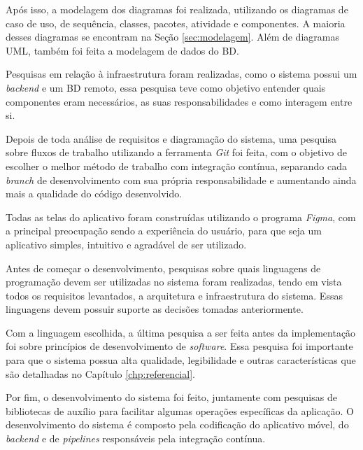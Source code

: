 Após isso, a modelagem dos diagramas foi realizada, utilizando os diagramas de caso de uso, de sequência, classes, pacotes, atividade e componentes. A maioria desses diagramas se encontram na Seção \ref{sec:modelagem}. Além de diagramas UML, também foi feita a modelagem de dados do BD.

Pesquisas em relação à infraestrutura foram realizadas, como o sistema possui um \textit{backend} e um BD remoto, essa pesquisa teve como objetivo entender quais componentes eram necessários, as suas responsabilidades e como interagem entre si.

Depois de toda análise de requisitos e diagramação do sistema, uma pesquisa sobre fluxos de trabalho utilizando a ferramenta \textit{Git} foi feita, com o objetivo de escolher o melhor método de trabalho com integração contínua, separando cada \textit{branch} de desenvolvimento com sua própria responsabilidade e aumentando ainda mais a qualidade do código desenvolvido.

Todas as telas do aplicativo foram construídas utilizando o programa \textit{Figma}, com a principal preocupação sendo a experiência do usuário, para que seja um aplicativo simples, intuitivo e agradável de ser utilizado.

Antes de começar o desenvolvimento, pesquisas sobre quais linguagens de programação devem ser utilizadas no sistema foram realizadas, tendo em vista todos os requisitos levantados, a arquitetura e infraestrutura do sistema. Essas linguagens devem possuir suporte as decisões tomadas anteriormente.

Com a linguagem escolhida, a última pesquisa a ser feita antes da implementação foi sobre princípios de desenvolvimento de \textit{software}. Essa pesquisa foi importante para que o sistema possua alta qualidade, legibilidade e outras características que são detalhadas no Capítulo \ref{chp:referencial}.

Por fim, o desenvolvimento do sistema foi feito, juntamente com pesquisas de bibliotecas de auxílio para facilitar algumas operações específicas da aplicação. O desenvolvimento do sistema é composto pela codificação do aplicativo móvel, do \textit{backend} e de \textit{pipelines} responsáveis pela integração contínua.
